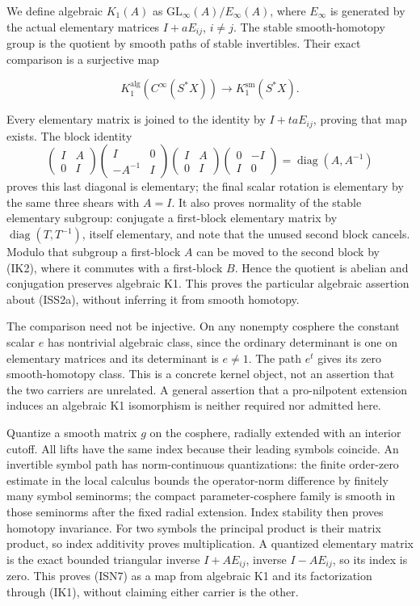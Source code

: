 \documentclass[
  11pt,
]{article}
\newcounter{none} %
\begin{document}
We define algebraic \(K_1(A)\) as \(\mathrm{GL}_\infty(A)/E_\infty(A)\),
where \(E_\infty\) is generated by the actual elementary matrices
\(I+aE_{ij}\), \(i\ne j\). The stable smooth-homotopy group is the
quotient by smooth paths of stable invertibles. Their exact comparison
is a surjective map

\[
 K_1^{\mathrm{alg}}(C^\infty(S^*X))
       \longrightarrow K_1^{\mathrm{sm}}(S^*X).
\tag{IK1}
\]

Every elementary matrix is joined to the identity by \(I+taE_{ij}\),
proving that map exists. The block identity \[
 \begin{pmatrix}I&A\\0&I\end{pmatrix}
 \begin{pmatrix}I&0\\-A^{-1}&I\end{pmatrix}
 \begin{pmatrix}I&A\\0&I\end{pmatrix}
 \begin{pmatrix}0&-I\\I&0\end{pmatrix}
       =\operatorname{diag}(A,A^{-1})
\tag{IK2}
\] proves this last diagonal is elementary; the final scalar rotation is
elementary by the same three shears with \(A=I\). It also proves
normality of the stable elementary subgroup: conjugate a first-block
elementary matrix by \(\operatorname{diag}(T,T^{-1})\), itself
elementary, and note that the unused second block cancels. Modulo that
subgroup a first-block \(A\) can be moved to the second block by (IK2),
where it commutes with a first-block \(B\). Hence the quotient is
abelian and conjugation preserves algebraic K1. This proves the
particular algebraic assertion about (ISS2a), without inferring it from
smooth homotopy.

The comparison need not be injective. On any nonempty cosphere the
constant scalar \(e\) has nontrivial algebraic class, since the ordinary
determinant is one on elementary matrices and its determinant is
\(e\ne1\). The path \(e^t\) gives its zero smooth-homotopy class. This
is a concrete kernel object, not an assertion that the two carriers are
unrelated. A general assertion that a pro-nilpotent extension induces an
algebraic K1 isomorphism is neither required nor admitted here.

Quantize a smooth matrix \(g\) on the cosphere, radially extended with
an interior cutoff. All lifts have the same index because their leading
symbols coincide. An invertible symbol path has norm-continuous
quantizations: the finite order-zero estimate in the local calculus
bounds the operator-norm difference by finitely many symbol seminorms;
the compact parameter-cosphere family is smooth in those seminorms after
the fixed radial extension. Index stability then proves homotopy
invariance. For two symbols the principal product is their matrix
product, so index additivity proves multiplication. A quantized
elementary matrix is the exact bounded triangular inverse \(I+AE_{ij}\),
inverse \(I-AE_{ij}\), so its index is zero. This proves (ISN7) as a map
from algebraic K1 and its factorization through (IK1), without claiming
either carrier is the other.
\end{document}
